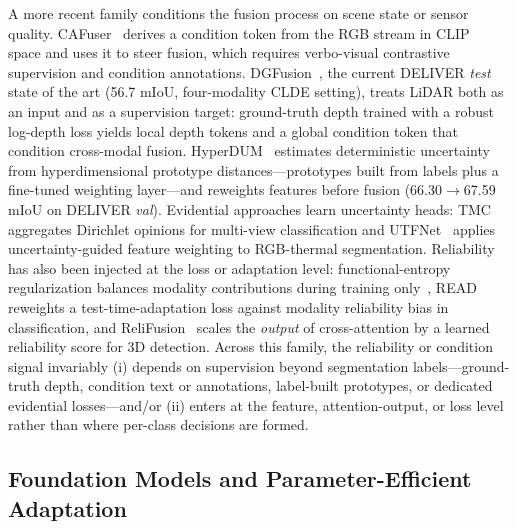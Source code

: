 A more recent family conditions the fusion process on scene state or sensor quality. CAFuser~\cite{cafuser2025} derives a condition token from the RGB stream in CLIP~\cite{clip2021} space and uses it to steer fusion, which requires verbo-visual contrastive supervision and condition annotations. DGFusion~\cite{dgfusion2026}, the current DELIVER \emph{test} state of the art (56.7 mIoU, four-modality CLDE setting), treats LiDAR both as an input and as a supervision target: ground-truth depth trained with a robust log-depth loss yields local depth tokens and a global condition token that condition cross-modal fusion. HyperDUM~\cite{hyperdum2025} estimates deterministic uncertainty from hyperdimensional prototype distances---prototypes built from labels plus a fine-tuned weighting layer---and reweights features before fusion (66.30$\rightarrow$67.59 mIoU on DELIVER \emph{val}). Evidential approaches learn uncertainty heads: TMC~\cite{tmc2021} aggregates Dirichlet opinions for multi-view classification and UTFNet~\cite{utfnet2023} applies uncertainty-guided feature weighting to RGB-thermal segmentation. Reliability has also been injected at the loss or adaptation level: functional-entropy regularization balances modality contributions during training only~\cite{zheng2025entropy}, READ~\cite{read2024} reweights a test-time-adaptation loss against modality reliability bias in classification, and ReliFusion~\cite{relifusion2025} scales the \emph{output} of cross-attention by a learned reliability score for 3D detection. Across this family, the reliability or condition signal invariably (i) depends on supervision beyond segmentation labels---ground-truth depth, condition text or annotations, label-built prototypes, or dedicated evidential losses---and/or (ii) enters at the feature, attention-output, or loss level rather than where per-class decisions are formed.

\subsection{Foundation Models and Parameter-Efficient Adaptation}
\label{sec:related:vfm}

